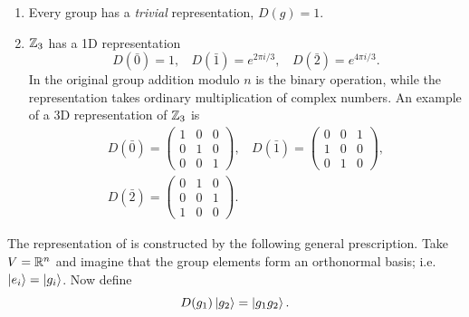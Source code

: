 \begin{example*}{}{}
\leavevmode
\begin{enumerate}
  \item Every group has a {\it trivial} 
    representation, $D(g)=1$.
  \item 
  $\mathbb{Z}_3$ has a 1D representation
  \begin{equation}
    D\left(\bar{0}\right)=1,~~~~
    D\left(\bar{1}\right)=e^{2\pi i/3},~~~~
    D\left(\bar{2}\right)=e^{4\pi i/3}.
  \end{equation}
  In the original group addition modulo $n$ is the binary operation,
  while the representation takes ordinary multiplication of complex numbers.
  An example of a 3D representation of $\mathbb{Z}_3$ is
  \begin{equation}\label{eq:reg}
  \begin{gathered}
    D\left(\bar{0}\right)=\left(\begin{array}{ccc}
                           1 & 0 & 0 \\
                           0 & 1 & 0 \\
                           0 & 0 & 1
                          \end{array}\right),~~~~
    D\left(\bar{1}\right)=\left(\begin{array}{ccc}
                           0 & 0 & 1 \\
                           1 & 0 & 0 \\
                           0 & 1 & 0
                          \end{array}\right),\\
    D\left(\bar{2}\right)=\left(\begin{array}{ccc}
                           0 & 1 & 0 \\
                           0 & 0 & 1 \\
                           1 & 0 & 0
                          \end{array}\right).
  \end{gathered}
  \end{equation}
  \end{enumerate}
\end{example*}
The representation of  is constructed by 
the following general prescription. Take $V=\mathbb{R}^n$ 
and imagine that the group elements form an orthonormal 
basis; i.e. $\ket{e_i}=\ket{g_i}$. Now define
\begin{equation}
  D(g_1)\ket{g_2}=\ket{g_1g_2}.
\end{equation}
